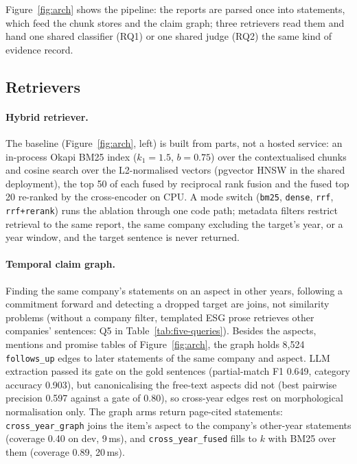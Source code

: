 \documentclass[11pt]{article}
\newcommand{\cond}[1]{\texttt{#1}}
\begin{document}
Figure~\ref{fig:arch} shows the pipeline: the reports are parsed once into statements, which feed the chunk stores and the claim graph; three retrievers read them and hand one shared classifier (RQ1) or one shared judge (RQ2) the same kind of evidence record.

\subsection{Retrievers}

\paragraph{Hybrid retriever.}
\label{sec:hybrid}
The baseline (Figure~\ref{fig:arch}, left) is built from parts, not a hosted service: an in-process Okapi BM25 index ($k_1 = 1.5$, $b = 0.75$) over the contextualised chunks and cosine search over the L2-normalised vectors (pgvector HNSW in the shared deployment), the top 50 of each fused by reciprocal rank fusion and the fused top 20 re-ranked by the cross-encoder on CPU. A mode switch (\texttt{bm25}, \texttt{dense}, \texttt{rrf}, \texttt{rrf+rerank}) runs the ablation through one code path; metadata filters restrict retrieval to the same report, the same company excluding the target's year, or a year window, and the target sentence is never returned.

\paragraph{Temporal claim graph.}
\label{sec:graph}
Finding the same company's statements on an aspect in other years, following a commitment forward and detecting a dropped target are joins, not similarity problems (without a company filter, templated ESG prose retrieves other companies' sentences: Q5 in Table~\ref{tab:five-queries}). Besides the aspects, mentions and promise tables of Figure~\ref{fig:arch}, the graph holds 8,524 \texttt{follows\_up} edges to later statements of the same company and aspect. LLM extraction passed its gate on the gold sentences (partial-match F1 0.649, category accuracy 0.903), but canonicalising the free-text aspects did not (best pairwise precision 0.597 against a gate of 0.80), so cross-year edges rest on morphological normalisation only. The graph arms return page-cited statements: \cond{cross\_year\_graph} joins the item's aspect to the company's other-year statements (coverage 0.40 on dev, 9\,ms), and \cond{cross\_year\_fused} fills to $k$ with BM25 over them (coverage 0.89, 20\,ms).
\end{document}
